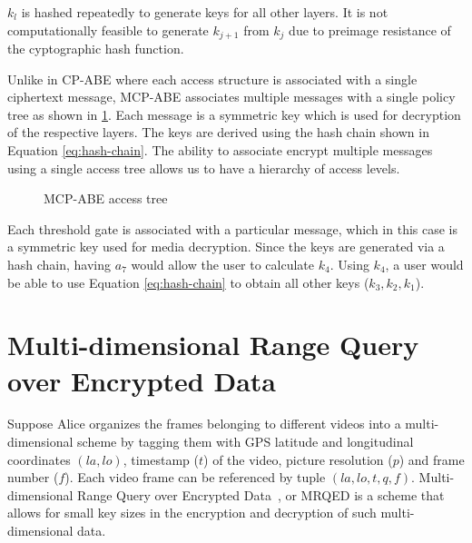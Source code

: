 \documentclass[hyp,a4paper,12pt,openbib]{socreport}
\begin{document}
$k_l$ is hashed repeatedly to generate keys for all other layers. It is not computationally feasible to generate $k_{j+1}$ from $k_j$ due to preimage resistance of the cyptographic hash function. 

Unlike in CP-ABE where each access structure is associated with a single ciphertext message, MCP-ABE  associates multiple messages with a single policy tree as shown in \cref{fig:access-tree-mcp}. Each message is a symmetric key which is used for decryption of the respective layers. The keys are derived using the hash chain shown in Equation \ref{eq:hash-chain}. The ability to associate encrypt multiple messages using a single access tree allows us to have a hierarchy of access levels.
\begin{figure}[h]
\centering
{}
\caption{MCP-ABE access tree} \label{fig:access-tree-mcp}
\end{figure}

 Each threshold gate is associated with a particular message, which in this case is a symmetric key used for media decryption. Since the keys are generated via a hash chain, having $a_7$ would allow the user to calculate $k_4$. Using $k_4$, a user would be able to use Equation \ref{eq:hash-chain} to obtain all other keys ($k_3,k_2,k_1$). 

\section{Multi-dimensional Range Query over Encrypted Data}
\label{chapt:mrqed}

Suppose Alice organizes the frames belonging to different videos into a multi-dimensional scheme by tagging them with GPS latitude and longitudinal coordinates $(la, lo)$, timestamp ($t$) of the video, picture resolution ($p$) and frame number ($f$). Each video frame can be referenced by tuple $(la, lo, t, q, f)$. Multi-dimensional Range Query over Encrypted Data~\cite{shi2007multi,Bethencourt06anonymousmultiattribute}, or MRQED is a scheme that allows for small key sizes in the encryption and decryption of such multi-dimensional data.
\end{document}
